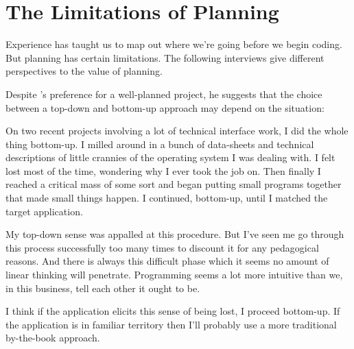 \section{The Limitations of Planning}%
%

Experience has taught us to map out where we're going before we begin
coding. But planning has certain limitations. The following interviews
give different perspectives to the value of planning.%
\begin{interview}
\noindent Despite 's preference for a well-planned project, he
suggests that the choice between a top-down and bottom-up approach may
depend on the situation:

\begin{tfquot}
On two recent projects involving a lot of technical interface work, I
did the whole thing bottom-up. I milled around in a bunch of
data-sheets and technical descriptions of little crannies of the
operating system I was dealing with. I felt lost most of the time,
wondering why I ever took the job on.  Then finally I reached a
critical mass of some sort and began putting small programs together
that made small things happen. I continued, bottom-up, until I matched
the target application.

My top-down sense was appalled at this procedure. But I've seen me go
through this process successfully too many times to discount it for
any pedagogical reasons. And there is always this difficult phase
which it seems no amount of linear thinking will penetrate.
Programming seems a lot more intuitive than we, in this business, tell
each other it ought to be.

I think if the application elicits this sense of being lost, I proceed
bottom-up. If the application is in familiar territory then I'll
probably use a more traditional by-the-book approach.
\end{tfquot}
\end{interview}%


